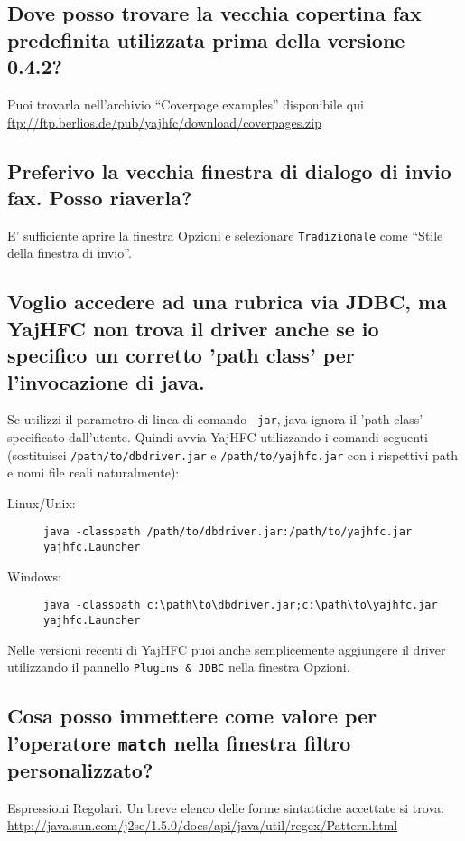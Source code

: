 \documentclass[a4paper,10pt]{scrartcl}
\begin{document}
\subsection{Dove posso trovare la vecchia copertina fax predefinita utilizzata prima della versione 0.4.2?}

Puoi trovarla nell'archivio ``Coverpage examples'' disponibile qui \url{ftp://ftp.berlios.de/pub/yajhfc/download/coverpages.zip}

\subsection{Preferivo la vecchia finestra di dialogo di invio fax. Posso riaverla?}

E' sufficiente aprire la finestra Opzioni e selezionare \texttt{Tradizionale} come ``Stile della finestra di invio''.

\subsection{Voglio accedere ad una rubrica via JDBC, ma YajHFC non trova il driver anche se io specifico un corretto 'path class' per l'invocazione di java.}

Se utilizzi il parametro di linea di comando \texttt{-jar}, java ignora il 'path class' specificato dall'utente.
Quindi avvia YajHFC utilizzando i comandi seguenti (sostituisci \texttt{/path/to/dbdriver.jar} e \texttt{/path/to/yajhfc.jar} con i rispettivi path e nomi file reali naturalmente):
\begin{description}
\item [Linux/Unix:] \verb#java -classpath /path/to/dbdriver.jar:/path/to/yajhfc.jar yajhfc.Launcher#
\item [Windows:] \verb#java -classpath c:\path\to\dbdriver.jar;c:\path\to\yajhfc.jar yajhfc.Launcher#
\end{description}

Nelle versioni recenti di YajHFC puoi anche semplicemente aggiungere il driver utilizzando il pannello \texttt{Plugins \& JDBC} nella finestra Opzioni.

\subsection{Cosa posso immettere come valore per l'operatore \texttt{match} nella finestra filtro personalizzato?}

Espressioni Regolari. Un breve elenco delle forme sintattiche accettate si trova:
\url{http://java.sun.com/j2se/1.5.0/docs/api/java/util/regex/Pattern.html}
\end{document}
